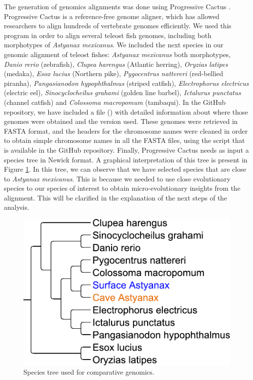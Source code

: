 The generation of genomics alignments was done using Progressive Cactus \parencite{armstrong_progressive_2020}. Progressive Cactus is a reference-free genome aligner, which has allowed researchers to align hundreds of vertebrate genomes efficiently. We used this program in order to align several teleost fish genomes, including both morphotypes of \textit{Astyanax mexicanus}. We included the next species in our genomic alignment of teleost fishes: \textit{Astyanax mexicanus} both morphotypes, \textit{Danio rerio} (zebrafish), \textit{Clupea harengus} (Atlantic herring), \textit{Oryzias latipes} (medaka), \textit{Esox lucius} (Northern pike), \textit{Pygocentrus nattereri} (red-bellied piranha), \textit{Pangasianodon hypophthalmus} (striped catfish), \textit{Electrophorus electricus} (electric eel), \textit{Sinocyclocheilus grahami} (golden line barbel), \textit{Ictalurus punctatus} (channel catfish) and \textit{Colossoma macropomum} (tambaqui). In the GitHub repository, we have included a file () with detailed information about where those genomes were obtained and the version used. These genomes were retrieved in FASTA format, and the headers for the chromosome names were cleaned in order to obtain simple chromosome names in all the FASTA files, using the script that is available in the GitHub repository. Finally, Progressive Cactus needs as input a species tree in Newick format. A graphical interpretation of this tree is present in Figure \ref{fig:methfig_species_tree}. In this tree, we can observe that we have selected species that are close to \textit{Astyanax mexicanus}. This is because we needed to use close evolutionary species to our species of interest to obtain micro-evolutionary insights from the alignment. This will be clarified in the explanation of the next steps of the analysis.

\begin{figure}
\centering
\includegraphics{Figures/astyanax/species_tree}
\caption[Species tree used for comparative genomics]{Species tree used for comparative genomics.}
\label{fig:methfig_species_tree}
\end{figure}

